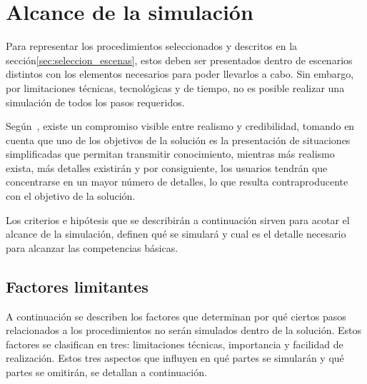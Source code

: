 \section{Alcance de la simulación}
\label{sec:alcance}

Para representar los procedimientos seleccionados y descritos en la
sección\ref{sec:seleccion_escenas}, estos deben ser presentados dentro de
escenarios distintos con los elementos necesarios para poder llevarlos a cabo.
Sin embargo, por limitaciones técnicas, tecnológicas y de tiempo, no es posible
realizar una simulación de todos los pasos requeridos.

Según~\cite{videojuegos:gonzaleztardon}, existe un compromiso visible entre
realismo y credibilidad, tomando en cuenta que uno de los objetivos de la
solución es la presentación de situaciones simplificadas que permitan transmitir
conocimiento, mientras más realismo exista, más detalles existirán y por
consiguiente, los usuarios tendrán que concentrarse en un mayor número de
detalles, lo que resulta contraproducente con el objetivo de la
solución\cite{videojuegos:gonzaleztardon}. 

Los criterios e hipótesis que se describirán a continuación sirven para acotar
el alcance de la simulación, definen qué se simulará y cual es el detalle
necesario para alcanzar las competencias básicas.



\subsection{Factores limitantes}

A continuación se describen los factores que determinan por qué ciertos pasos
relacionados a los procedimientos no serán simulados dentro de la solución.
Estos factores se clasifican en tres: limitaciones técnicas, importancia y
facilidad de realización. Estos tres aspectos que influyen en qué partes se
simularán y qué partes se omitirán, se detallan a continuación.


